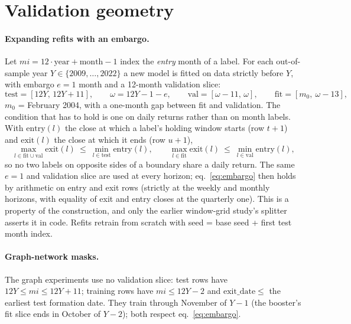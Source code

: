 \section{Validation geometry}\label{sec:valid}

\paragraph{Expanding refits with an embargo.}
Let $\mathit{mi}=12\cdot\mathrm{year}+\mathrm{month}-1$ index the \emph{entry} month of a label. For each out-of-sample year $Y\in\{2009,\dots,2022\}$ a new model is fitted on data strictly before $Y$, with embargo $e=1$ month and a 12-month validation slice:
\begin{equation}\label{eq:split}
\text{test}=[12Y,\,12Y{+}11],\qquad \omega=12Y-1-e,\qquad \text{val}=[\omega-11,\,\omega],\qquad \text{fit}=[m_0,\ \omega-13],
\end{equation}
$m_0$ = February 2004, with a one-month gap between fit and validation. The condition that has to hold is one on daily returns rather than on month labels. With $\mathrm{entry}(l)$ the close at which a label's holding window starts (row $t{+}1$) and $\mathrm{exit}(l)$ the close at which it ends (row $u{+}1$),
\begin{equation}\label{eq:embargo}
\max_{l\in\text{fit}\cup\text{val}}\mathrm{exit}(l)\ \le\ \min_{l\in\text{test}}\mathrm{entry}(l),\qquad
\max_{l\in\text{fit}}\mathrm{exit}(l)\ \le\ \min_{l\in\text{val}}\mathrm{entry}(l),
\end{equation}
so no two labels on opposite sides of a boundary share a daily return. The same $e=1$ and validation slice are used at every horizon; eq.~\eqref{eq:embargo} then holds by arithmetic on entry and exit rows (strictly at the weekly and monthly horizons, with equality of exit and entry closes at the quarterly one). This is a property of the construction, and only the earlier window-grid study's splitter asserts it in code. Refits retrain from scratch with seed = base seed + first test month index.

\paragraph{Graph-network masks.}
The graph experiments use no validation slice: test rows have $12Y\le\mathit{mi}\le12Y{+}11$; training rows have $\mathit{mi}\le12Y-2$ and $\mathrm{exit\_date}\le$ the earliest test formation date. They train through November of $Y{-}1$ (the booster's fit slice ends in October of $Y{-}2$); both respect eq.~\eqref{eq:embargo}.

